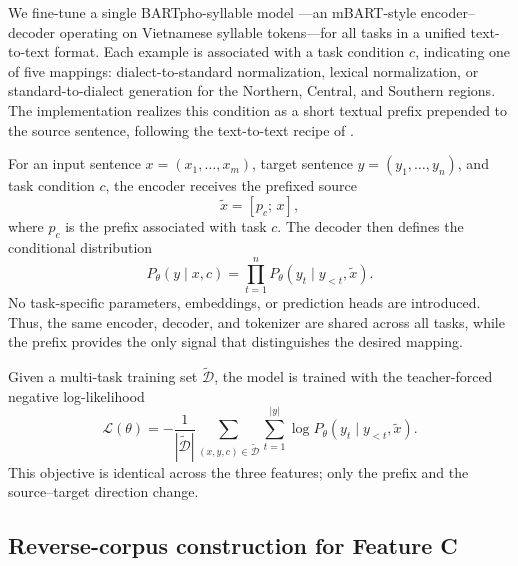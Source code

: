 \documentclass[11pt]{article}
\begin{document}
We fine-tune a single BARTpho-syllable model \citep{tran2022bartpho}---an
mBART-style encoder--decoder \citep{liu2020mbart} operating on Vietnamese
syllable tokens---for all tasks in a unified text-to-text format. Each example is
associated with a task condition \(c\), indicating one of five mappings:
dialect-to-standard normalization, lexical normalization, or
standard-to-dialect generation for the Northern, Central, and Southern regions.
The implementation realizes this condition as a short textual prefix prepended to
the source sentence, following the text-to-text recipe of \citet{raffel2020t5}.

For an input sentence \(x=(x_1,\dots,x_m)\), target sentence
\(y=(y_1,\dots,y_n)\), and task condition \(c\), the encoder receives the
prefixed source
\begin{equation}
  \tilde{x} = [p_c;\,x],
  \label{eq:prefixed-source}
\end{equation}
where \(p_c\) is the prefix associated with task \(c\). The decoder then defines
the conditional distribution
\begin{equation}
  P_\theta(y\mid x,c)
  =
  \prod_{t=1}^{n}
  P_\theta\!\left(y_t \mid y_{<t}, \tilde{x}\right).
  \label{eq:method-seq2seq}
\end{equation}
No task-specific parameters, embeddings, or prediction heads are introduced.
Thus, the same encoder, decoder, and tokenizer are shared across all tasks, while
the prefix provides the only signal that distinguishes the desired mapping.

Given a multi-task training set \(\widetilde{\mathcal{D}}\), the model is trained
with the teacher-forced negative log-likelihood
\begin{equation}
  \mathcal{L}(\theta)
  =
  -\frac{1}{|\widetilde{\mathcal{D}}|}
  \sum_{(x,y,c)\in\widetilde{\mathcal{D}}}
  \sum_{t=1}^{|y|}
  \log P_\theta\!\left(y_t \mid y_{<t}, \tilde{x}\right).
  \label{eq:method-loss}
\end{equation}
This objective is identical across the three features; only the prefix and the
source--target direction change.

\subsection{Reverse-corpus construction for Feature C}
\label{sec:method-reverse}
\end{document}
